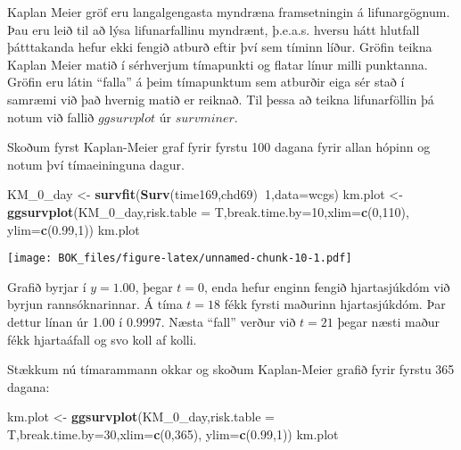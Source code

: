 \documentclass[
]{book}
\newenvironment{Shaded}{\begin{snugshade}}{\end{snugshade}}
\newcommand{\DataTypeTok}[1]{\textcolor[rgb]{0.13,0.29,0.53}{#1}}
\newcommand{\DecValTok}[1]{\textcolor[rgb]{0.00,0.00,0.81}{#1}}
\newcommand{\FloatTok}[1]{\textcolor[rgb]{0.00,0.00,0.81}{#1}}
\newcommand{\KeywordTok}[1]{\textcolor[rgb]{0.13,0.29,0.53}{\textbf{#1}}}
\newcommand{\NormalTok}[1]{#1}
\newcommand{\OperatorTok}[1]{\textcolor[rgb]{0.81,0.36,0.00}{\textbf{#1}}}
\newcommand{\StringTok}[1]{\textcolor[rgb]{0.31,0.60,0.02}{#1}}
\begin{document}
Kaplan Meier gröf eru langalgengasta myndræna framsetningin á lifunargögnum. Þau eru leið til að lýsa lifunarfallinu myndrænt, þ.e.a.s. hversu hátt hlutfall þátttakanda hefur ekki fengið atburð eftir því sem tíminn líður. Gröfin teikna Kaplan Meier matið í sérhverjum tímapunkti og flatar línur milli punktanna. Gröfin eru látin ``falla'' á þeim tímapunktum sem atburðir eiga sér stað í samræmi við það hvernig matið er reiknað. Til þessa að teikna lifunarföllin þá notum við fallið \(ggsurvplot\) úr \(survminer\).

Skoðum fyrst Kaplan-Meier graf fyrir fyrstu 100 dagana fyrir allan hópinn og notum því tímaeininguna dagur.

\begin{Shaded}
\begin{Highlighting}[]
\NormalTok{KM_}\DecValTok{0}\NormalTok{_day <-}\StringTok{ }\KeywordTok{survfit}\NormalTok{(}\KeywordTok{Surv}\NormalTok{(time169,chd69)}\OperatorTok{~}\DecValTok{1}\NormalTok{,}\DataTypeTok{data=}\NormalTok{wcgs)}
\NormalTok{km.plot <-}\StringTok{ }\KeywordTok{ggsurvplot}\NormalTok{(KM_}\DecValTok{0}\NormalTok{_day,}\DataTypeTok{risk.table =}\NormalTok{ T,}\DataTypeTok{break.time.by=}\DecValTok{10}\NormalTok{,}\DataTypeTok{xlim=}\KeywordTok{c}\NormalTok{(}\DecValTok{0}\NormalTok{,}\DecValTok{110}\NormalTok{),}
                      \DataTypeTok{ylim=}\KeywordTok{c}\NormalTok{(}\FloatTok{0.99}\NormalTok{,}\DecValTok{1}\NormalTok{)) }
\NormalTok{km.plot }
\end{Highlighting}
\end{Shaded}

\texttt{[image: BOK\_files/figure-latex/unnamed-chunk-10-1.pdf]}

Grafið byrjar í \(y=1.00\), þegar \(t=0\), enda hefur enginn fengið hjartasjúkdóm við byrjun rannsóknarinnar. Á tíma \(t=18\) fékk fyrsti maðurinn hjartasjúkdóm. Þar dettur línan úr 1.00 í 0.9997. Næsta ``fall'' verður við \(t=21\) þegar næsti maður fékk hjartaáfall og svo koll af kolli.

Stækkum nú tímarammann okkar og skoðum Kaplan-Meier grafið fyrir fyrstu 365 dagana:

\begin{Shaded}
\begin{Highlighting}[]
\NormalTok{km.plot <-}\StringTok{ }\KeywordTok{ggsurvplot}\NormalTok{(KM_}\DecValTok{0}\NormalTok{_day,}\DataTypeTok{risk.table =}\NormalTok{ T,}\DataTypeTok{break.time.by=}\DecValTok{30}\NormalTok{,}\DataTypeTok{xlim=}\KeywordTok{c}\NormalTok{(}\DecValTok{0}\NormalTok{,}\DecValTok{365}\NormalTok{),}
                      \DataTypeTok{ylim=}\KeywordTok{c}\NormalTok{(}\FloatTok{0.99}\NormalTok{,}\DecValTok{1}\NormalTok{)) }
\NormalTok{km.plot }
\end{Highlighting}
\end{Shaded}
\end{document}
